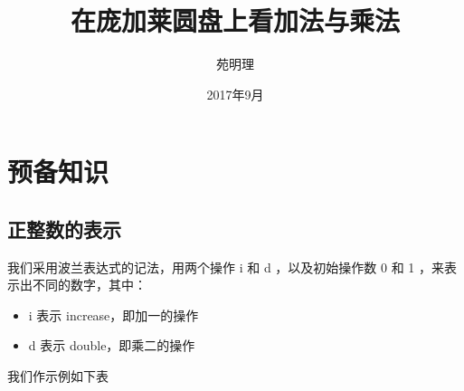 \documentclass[a4paper,12pt]{article}
\title{在庞加莱圆盘上看加法与乘法}
\author{苑明理}
\date{2017年9月}
\begin{document}
\maketitle{}

\renewcommand\contentsname{目录}
\setcounter{tocdepth}{2}
\tableofcontents

\newpage

\section{预备知识}

\subsection{正整数的表示}

我们采用波兰表达式的记法，用两个操作 i 和 d ，以及初始操作数 0 和 1 ，来表示出不同的数字，其中：

\begin{itemize}
\item i 表示 increase，即加一的操作
\item d 表示 double，即乘二的操作
\end{itemize}

我们作示例如下表
\end{document}
